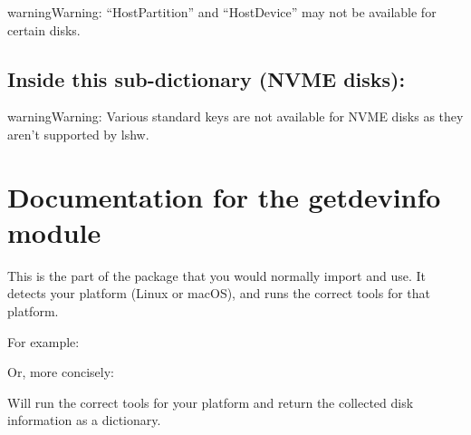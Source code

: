 \documentclass[letterpaper,10pt,english]{sphinxmanual}
\begin{document}
\begin{sphinxadmonition}{warning}{Warning:}
“HostPartition” and “HostDevice” may not be available for certain disks.
\end{sphinxadmonition}


\section{Inside this sub-dictionary (NVME disks):}
\label{\detokenize{format:inside-this-sub-dictionary-nvme-disks}}
\begin{sphinxadmonition}{warning}{Warning:}
Various standard keys are not available for NVME disks as they aren’t supported by lshw.
\end{sphinxadmonition}


\chapter{Documentation for the getdevinfo module}
\label{\detokenize{getdevinfo:module-getdevinfo.getdevinfo}}\label{\detokenize{getdevinfo:documentation-for-the-getdevinfo-module}}\label{\detokenize{getdevinfo::doc}}
This is the part of the package that you would normally import and use.
It detects your platform (Linux or macOS), and runs the correct tools
for that platform.

For example:

\begin{sphinxVerbatim}[commandchars=\\\{\}]
 
\end{sphinxVerbatim}

Or, more concisely:

\begin{sphinxVerbatim}[commandchars=\\\{\}]
   
\end{sphinxVerbatim}

Will run the correct tools for your platform and return the collected
disk information as a dictionary.
\end{document}

